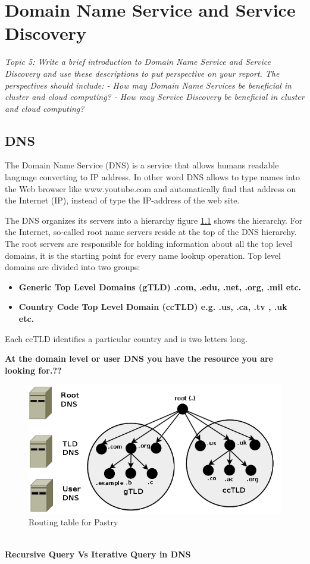 \chapter{Domain Name Service and Service Discovery}\label{ch:dns}
\textit{Topic 5: Write a brief introduction to Domain Name Service and Service Discovery and use these descriptions to put perspective on your report. The perspectives should include:
- How may Domain Name Services be beneficial in cluster and cloud computing?
- How may Service Discovery be beneficial in cluster and cloud computing?}
\section{DNS}
The Domain Name Service (DNS) is a service that allows humans readable language converting to IP address. In other word DNS allows to type names into the Web browser like www.youtube.com and automatically find that address on the Internet (IP), instead of type the IP-address of the web site.

The DNS organizes its servers into a hierarchy figure \ref{fig:DNShierarchy} shows the hierarchy. For the Internet, so-called root name servers reside at the top of the DNS hierarchy. The root servers are responsible for holding information about all the top level domains, it is the starting point for every name lookup operation. Top level domains are divided into two groups:

\begin{itemize}
\item \textbf{Generic Top Level Domains (gTLD) .com, .edu, .net, .org, .mil etc.}
\item \textbf{ Country Code Top Level Domain (ccTLD) e.g. .us, .ca, .tv , .uk etc.}
\end{itemize}
Each ccTLD identifies a particular country and is two letters long.   

\textbf{At the domain level or user DNS you have the resource you are looking for.??
}

\begin{figure}[bth]
\includegraphics[width=1\linewidth]{gfx/DNShierarchy}
\caption[routingtable]{Routing table for Pastry} \label{fig:DNShierarchy}
\end{figure}
\\
\textbf{Recursive Query Vs Iterative Query in DNS}

